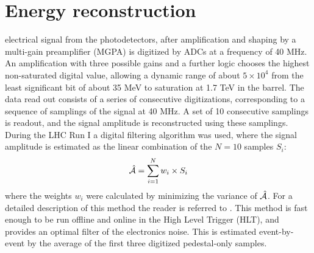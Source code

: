 \documentclass[journal]{IEEEtran}
\begin{document}
\section{Energy reconstruction}
\label{sec:energyreco}
 electrical signal from the photodetectors, after amplification and shaping by a multi-gain preamplifier (MGPA) is digitized by ADCs at a frequency of 40 MHz. An amplification with three possible gains and a further logic chooses the highest non-saturated digital value, allowing a dynamic range of about $5 \times 10^4$ from the least significant bit of about 35 MeV to saturation at 1.7 TeV in the barrel.
The data read out consists of a series of consecutive digitizations, corresponding to a sequence of samplings of the signal at 40 MHz. A set of 10 consecutive samplings is readout, and the signal amplitude is reconstructed using these samplings. During the LHC Run I a digital filtering algorithm was used, where the signal amplitude is estimated as the linear combination of the $N=10$ samples $S_i$:
\begin{equation}
\hat{\cal A}=\sum_{i=1}^{N} w_i \times S_i
\end{equation}
where the weights $w_i$ were calculated by minimizing the variance of $\hat{\cal A}$. For a detailed description of this method the reader is referred to \cite{Bruneliere:2006ra}. This method is fast enough to be run offline and online in the High Level Trigger (HLT), and provides an optimal filter of the electronics noise. This is estimated event-by-event by the average of the first three digitized pedestal-only samples.
\end{document}
